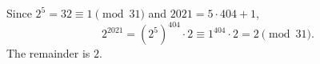 Since $2^5=32\equiv1\pmod{31}$ and $2021=5\cdot404+1$,
\[2^{2021}=\left(2^5\right)^{404}\cdot2\equiv1^{404}\cdot2=2\pmod{31}.\]
The remainder is $\boxed{2}$.
